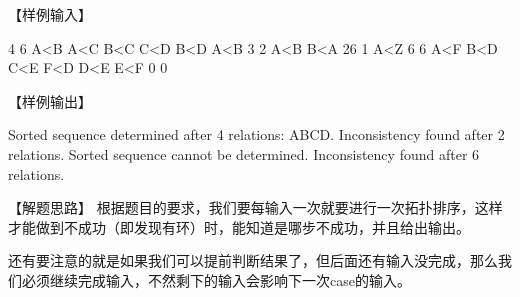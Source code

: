【样例输入】
\begin{Code}
    4 6
    A<B
    A<C
    B<C
    C<D
    B<D
    A<B
    3 2
    A<B
    B<A
    26 1
    A<Z
    6 6
    A<F
    B<D
    C<E
    F<D
    D<E
    E<F
    0 0
\end{Code}

【样例输出】
\begin{Code}
    Sorted sequence determined after 4 relations: ABCD.
    Inconsistency found after 2 relations.
    Sorted sequence cannot be determined.
    Inconsistency found after 6 relations.
\end{Code}

【解题思路】
根据题目的要求，我们要每输入一次就要进行一次拓扑排序，这样才能做到不成功（即发现有环）时，能知道是哪步不成功，并且给出输出。

还有要注意的就是如果我们可以提前判断结果了，但后面还有输入没完成，那么我们必须继续完成输入，不然剩下的输入会影响下一次case的输入。


